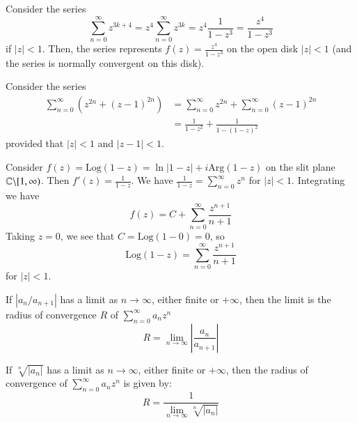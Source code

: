 \documentclass[12pt, a4paper, oneside, openright, titlepage]{book}
\begin{document}
\begin{eg}
    Consider the series \begin{equation*}
        \sum_{n=0}^{\infty}z^{3k+4} = z^4\sum_{n=0}^{\infty}z^{3k} = z^4\frac{1}{1-z^3} = \frac{z^4}{1-z^3}
    \end{equation*}
    if $|z| < 1$. Then, the series represents $f(z) = \frac{z^4}{1-z^3}$ on the open disk $|z| < 1$ (and the series is normally convergent on this disk).
\end{eg}


\begin{eg}
    Consider the series \begin{align*}
        \sum_{n=0}^{\infty}(z^{2n} + (z-1)^{2n}) &= \sum_{n=0}^{\infty}z^{2n} + \sum_{n=0}^{\infty}(z-1)^{2n} \\
        &= \frac{1}{1-z^2} + \frac{1}{1-(1-z)^2}
    \end{align*}
    provided that $|z| < 1$ and $|z-1| < 1$.
\end{eg}

\begin{eg}
    Consider $f(z) = \text{Log}(1-z) = \ln|1-z| + i\text{Arg}(1-z)$ on the slit plane $\mathbb C\backslash[1,\infty)$. Then $f'(z) = \frac{1}{1-z}$. We have $\frac{1}{1-z} = \sum_{n=0}^{\infty}z^n$ for $|z| < 1$. Integrating we have \begin{equation*}
        f(z) = C+\sum_{n=0}^{\infty}\frac{z^{n+1}}{n+1}
    \end{equation*}
    Taking $z = 0$, we see that $C = \text{Log}(1-0) = 0$, so \begin{equation*}
        \text{Log}(1-z) = \sum_{n=0}^{\infty}\frac{z^{n+1}}{n+1}
    \end{equation*}
    for $|z| < 1$.
\end{eg}


\begin{thm}
    If $|a_n/a_{n+1}|$ has a limit as $n\rightarrow \infty$, either finite or $+\infty$, then the limit is the radius of convergence $R$ of $\sum_{n=0}^{\infty}a_nz^n$ \begin{equation*}
        R = \lim\limits_{n\rightarrow \infty}\left|\frac{a_n}{a_{n+1}}\right|
    \end{equation*}
\end{thm}

\begin{thm}
    If $\sqrt[n]{|a_n|}$ has a limit as $n\rightarrow \infty$, either finite or $+\infty$, then the radius of convergence of $\sum_{n=0}^{\infty}a_nz^n$ is given by: \begin{equation*}
        R = \frac{1}{\lim\limits_{n\rightarrow \infty}\sqrt[n]{|a_n|}}
    \end{equation*}
\end{thm}
\end{document}
